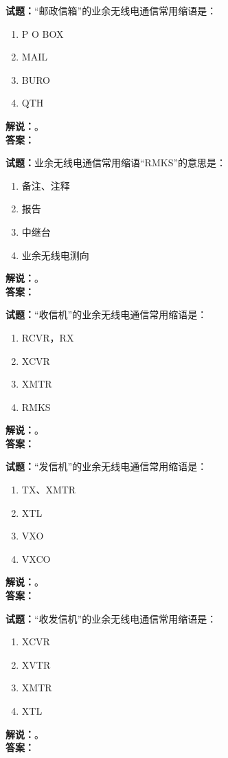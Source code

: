 \documentclass{ctexbook}
\begin{document}
\bigskip

\noindent\textbf{试题：}“邮政信箱”的业余无线电通信常用缩语是：
\begin{enumerate}[leftmargin=3em]
  \item P O BOX
  \item MAIL
  \item BURO
  \item QTH
\end{enumerate}
\noindent\textbf{解说：}\textbf{}。\\\noindent\textbf{答案：}

\bigskip

\noindent\textbf{试题：}业余无线电通信常用缩语“RMKS”的意思是：
\begin{enumerate}[leftmargin=3em]
  \item 备注、注释
  \item 报告
  \item 中继台
  \item 业余无线电测向
\end{enumerate}
\noindent\textbf{解说：}\textbf{}。\\\noindent\textbf{答案：}

\bigskip

\noindent\textbf{试题：}“收信机”的业余无线电通信常用缩语是：
\begin{enumerate}[leftmargin=3em]
  \item RCVR，RX
  \item XCVR
  \item XMTR
  \item RMKS
\end{enumerate}
\noindent\textbf{解说：}\textbf{}。\\\noindent\textbf{答案：}

\bigskip

\noindent\textbf{试题：}“发信机”的业余无线电通信常用缩语是：
\begin{enumerate}[leftmargin=3em]
  \item TX、XMTR
  \item XTL
  \item VXO
  \item VXCO
\end{enumerate}
\noindent\textbf{解说：}\textbf{}。\\\noindent\textbf{答案：}

\bigskip

\noindent\textbf{试题：}“收发信机”的业余无线电通信常用缩语是：
\begin{enumerate}[leftmargin=3em]
  \item XCVR
  \item XVTR
  \item XMTR
  \item XTL
\end{enumerate}
\noindent\textbf{解说：}\textbf{}。\\\noindent\textbf{答案：}
\end{document}
